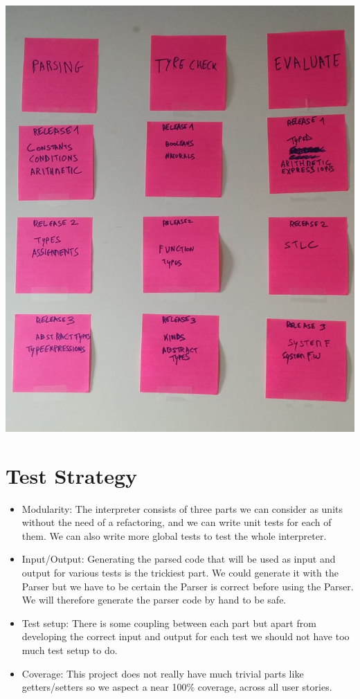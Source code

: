 \documentclass[pdftex,a4paper,11pt]{article}
\begin{document}
\begin{center}
\includegraphics[scale=0.25]{userstorymapping_big.png}
\label{registration}
\end{center}

\section{Test Strategy}


\begin{itemize}
  \item Modularity: The interpreter consists of three parts we can consider as units without the need of a refactoring, and we can write unit tests for each of them. We can also write more global tests to test the whole interpreter.
  \item Input/Output: Generating the parsed code that will be used as input and output for various tests is the trickiest part. We could generate it with the Parser but we have to be certain the Parser is correct before using the Parser. 
  We will therefore generate the parser code by hand to be safe.
  \item Test setup: There is some coupling between each part but apart from developing the correct input and output for each test we should not have too much test setup to do.
  \item Coverage: This project does not really have much trivial parts like getters/setters so we aspect a near 100$\%$ coverage, across all user stories. 
\end{itemize}
\end{document}
